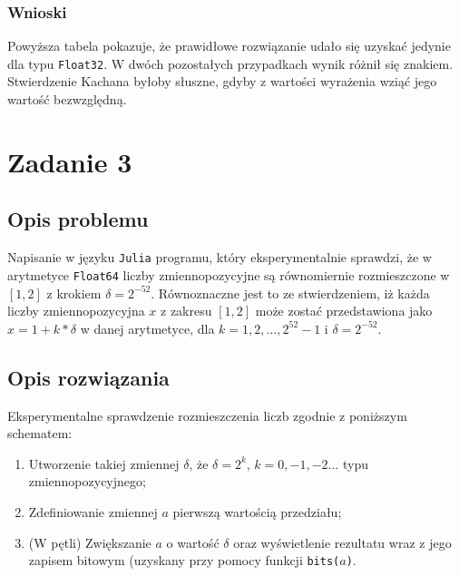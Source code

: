 \documentclass{classrep}
\begin{document}
	\subsubsection{Wnioski}
		Powyższa tabela pokazuje, że prawidłowe rozwiązanie udało się uzyskać jedynie dla typu 
		\texttt{Float32}. W dwóch pozostałych przypadkach wynik różnił się znakiem. Stwierdzenie Kachana
		byłoby słuszne, gdyby z wartości wyrażenia wziąć jego wartość bezwzględną.
\section{Zadanie 3}
	\subsection{Opis problemu}
		Napisanie w języku \texttt{Julia} programu, który eksperymentalnie sprawdzi, że w arytmetyce 
		\texttt{Float64} liczby zmiennopozycyjne są równomiernie rozmieszczone w $[1,2]$ z krokiem $\delta = 
		2^{-52}$. Równoznaczne jest to ze stwierdzeniem, iż każda liczby zmiennopozycyjna $x$ z zakresu 
		$[1,2]$ może zostać przedstawiona jako $x = 1 + k * \delta$ w danej arytmetyce, dla 
		$k = 1,2,\dots,2^{52}-1$ i $\delta = 2^{-52}$.
	\subsection{Opis rozwiązania}
		Eksperymentalne sprawdzenie rozmieszczenia liczb zgodnie z poniższym schematem:
		\begin{enumerate}
			\item Utworzenie takiej zmiennej $\delta$, że $\delta = 2^{k}$, $k = 0,-1,-2\dots $ typu 
			zmiennopozycyjnego;
			\item Zdefiniowanie zmiennej $a$ pierwszą wartością przedziału;
			\item (W pętli) Zwiększanie $a$ o wartość $\delta$ oraz wyświetlenie rezultatu
			wraz z jego zapisem bitowym (uzyskany przy pomocy funkcji \texttt{bits($a$)}.
		\end{enumerate}
\end{document}
